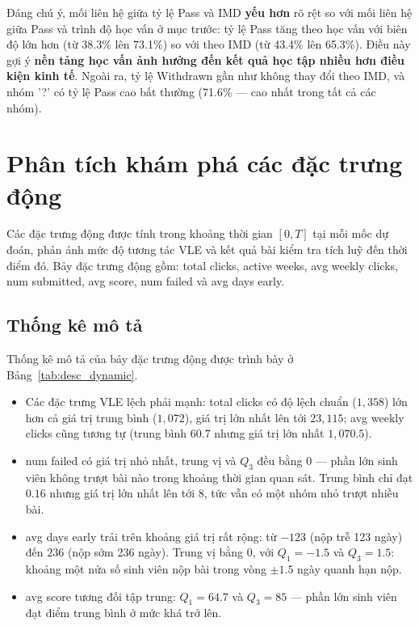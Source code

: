 \documentclass[a4paper]{article}
\newcommand{\code}[1]{{\ttfamily\def\_{\textunderscore\discretionary{}{}{}}#1}}
\def\code#1{#1}%
\def\_{ }%
\begin{document}
Đáng chú ý, mối liên hệ giữa tỷ lệ Pass và IMD \textbf{yếu hơn} rõ rệt so với
mối liên hệ giữa Pass và trình độ học vấn ở mục trước: tỷ lệ Pass tăng theo học
vấn với biên độ lớn hơn (từ 38.3\% lên 73.1\%) so với theo IMD (từ 43.4\% lên
65.3\%). Điều này gợi ý \textbf{nền tảng học vấn ảnh hưởng đến kết
quả học tập nhiều hơn điều kiện kinh tế}. Ngoài ra, tỷ lệ Withdrawn gần như
không thay đổi theo IMD, và nhóm \code{'?'} có tỷ lệ Pass cao bất thường
(71.6\% --- cao nhất trong tất cả các nhóm).

\section{Phân tích khám phá các đặc trưng động}

Các đặc trưng động được tính trong khoảng thời gian $[0, T]$ tại mỗi mốc dự đoán, phản ánh
mức độ tương tác VLE và kết quả bài kiểm tra tích luỹ đến thời điểm đó. Bảy đặc
trưng động gồm: \code{total\_clicks}, \code{active\_weeks},
\code{avg\_weekly\_clicks}, \code{num\_submitted}, \code{avg\_score},
\code{num\_failed} và \code{avg\_days\_early}.

\subsection{Thống kê mô tả}

Thống kê mô tả của bảy đặc trưng động được trình bày ở
Bảng~\ref{tab:desc_dynamic}.



\begin{itemize}[leftmargin=*]
  \item Các đặc trưng VLE lệch phải mạnh: \code{total\_clicks} có độ lệch
        chuẩn ($1{,}358$) lớn hơn cả giá trị trung bình ($1{,}072$), giá trị
        lớn nhất lên tới $23{,}115$; \code{avg\_weekly\_clicks} cũng tương tự
        (trung bình $60.7$ nhưng giá trị lớn nhất $1{,}070.5$).
  \item \code{num\_failed} có giá trị nhỏ nhất, trung vị và $Q_3$ đều bằng 0
        --- phần lớn sinh viên không trượt bài nào trong khoảng thời gian quan
        sát. Trung bình chỉ đạt $0.16$ nhưng giá trị lớn nhất lên tới 8, tức
        vẫn có một nhóm nhỏ trượt nhiều bài.
  \item \code{avg\_days\_early} trải trên khoảng giá trị rất rộng: từ $-123$
        (nộp trễ 123 ngày) đến $236$ (nộp sớm 236 ngày). Trung vị bằng 0, với
        $Q_1 = -1.5$ và $Q_3 = 1.5$: khoảng một nửa số sinh viên nộp bài trong
        vòng $\pm 1.5$ ngày quanh hạn nộp.
  \item \code{avg\_score} tương đối tập trung: $Q_1 = 64.7$ và $Q_3 = 85$ ---
        phần lớn sinh viên đạt điểm trung bình ở mức khá trở lên.
\end{itemize}
\end{document}
